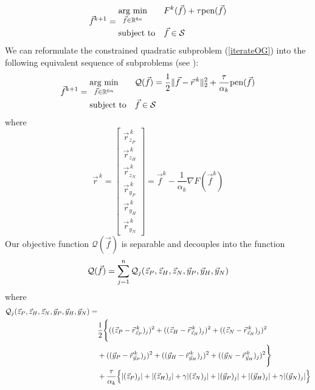 \begin{equation} \label{iterateOG}
	\vec{f}^{k+1} = 
	\begin{aligned}
		& \underset{\vec{f} \in \mathbb{R}^{6n}}{\text{arg min}}
		& & F^k(\vec{f}) + \tau \text{pen}(\vec{f}) \\
		& \text{subject to}
		& & \vec{f} \in \mathcal{S}
	\end{aligned}
\end{equation}
We can reformulate the constrained quadratic subproblem (\ref{iterateOG}) into the following equivalent sequence of subproblems (see \cite{Marcia_SPIRALTAP}):
\begin{equation} \label{subproblemIterate}
	\vec{f}^{k+1} = 
	\begin{aligned}
		& \underset{\vec{f} \in \mathbb{R}^{6n}}{\text{arg min}}
		& & \mathcal{Q}(\vec{f})= \frac{1}{2}\|\vec{f} - \vec{r}^{\,k}\|_2^2 + \frac{\tau}{\alpha_k} \text{pen}(\vec{f}) \\
		& \text{subject to}
		& & \vec{f} \in \mathcal{S}
	\end{aligned}
\end{equation}
where 
\renewcommand{\arraystretch}{1.4}
\begin{equation*}
	\vec{r}^{\,k} = 
	\begin{bmatrix}
		\vec{r}_{z_P}^{\,k} \\ \vec{r}_{z_H}^{\,k} \\ \vec{r}_{z_N}^{\,k}\\
		\vec{r}_{y_P}^{\,k} \\ \vec{r}_{y_H}^{\,k} \\ \vec{r}_{y_N}^{\,k}
	\end{bmatrix} 
	= \vec{f}^k - \frac{1}{\alpha_k} \nabla F(\vec{f}^k)
\end{equation*}
Our objective function $\mathcal{Q}(\vec{f})$ is separable and decouples into the function
$$ \mathcal{Q}(\vec{f}) = \sum_{j=1}^{n} \mathcal{Q}_j(\vec{z}_P, \vec{z}_H, \vec{z}_N, \vec{y}_P, \vec{y}_H, \vec{y}_N)$$
where 
\begin{align*}
	\mathcal{Q}_j(\vec{z}_P, \vec{z}_H, \vec{z}_N, \vec{y}_P, \vec{y}_H, \vec{y}_N) =& \\
	& \frac{1}{2}\Bigg\{
	((\vec{z}_P - \vec{r}_{\vec{z}_P}^{\, k})_j)^2 + 
	((\vec{z}_H - \vec{r}_{\vec{z}_H}^{\, k})_j)^2 +
	((\vec{z}_N - \vec{r}_{\vec{z}_H}^{\, k})_j)^2 \\ & + 
	((\vec{y}_P - \vec{r}_{\vec{y}_P}^{\, k})_j)^2 + 
	((\vec{y}_H - \vec{r}_{\vec{y}_H}^{\, k})_j)^2 +
	((\vec{y}_N - \vec{r}_{\vec{y}_H}^{\, k})_j)^2 \Bigg\} \\ &+
	\frac{\tau}{\alpha_k} \Big\{ |(\vec{z}_P)_j| + 
	|(\vec{z}_H)_j| + \gamma |(\vec{z}_N)_j| + |(\vec{y}_P)_j| + 
	|(\vec{y}_H)_j| + \gamma |(\vec{y}_N)_j|\Big\}
\end{align*}

